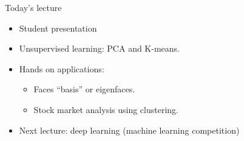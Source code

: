 \documentclass[10pt]{beamer}
\begin{document}
\begin{frame}{Today's lecture}
  \begin{itemize}
    \item Student presentation
    \item Unsupervised learning: PCA and K-means.
    \item Hands on applications: 
    \begin{itemize}
    \item Faces ``basis'' or eigenfaces.
    \item Stock market analysis using clustering.
    \end{itemize}
    \item Next lecture: deep learning (machine learning competition)
  \end{itemize}
\end{frame}
% 
% 
% 
% 
% 
% 
% 
% 
% 
% 
\end{document}
